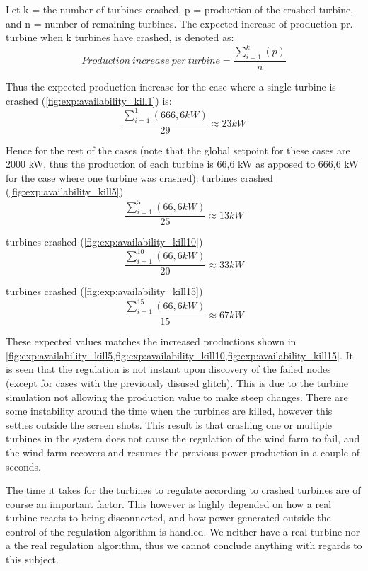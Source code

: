 Let k = the number of turbines crashed, p = production of the crashed turbine, and n = number of remaining turbines. The expected increase of production pr. turbine when k turbines have crashed, is denoted as: 
$$Production~increase~per~turbine = \frac{\sum\limits_{i=1}^k(p)}{n}$$

Thus the expected production increase for the case where a single turbine is crashed (\cref{fig:exp:availability_kill1}) is: $$\frac{\sum\limits_{i=1}^1(666,6kW)}{29}\approx23kW$$

Hence for the rest of the cases (note that the global setpoint for these cases are 2000 kW, thus the production of each turbine is 66,6 kW as apposed to 666,6 kW for the case where one turbine was crashed):
\newline\newline
{} turbines crashed (\cref{fig:exp:availability_kill5}) $$\frac{\sum\limits_{i=1}^5(66,6kW)}{25}\approx13kW$$

 turbines crashed (\cref{fig:exp:availability_kill10}) $$\frac{\sum\limits_{i=1}^{10}(66,6kW)}{20}\approx33kW$$

 turbines crashed (\cref{fig:exp:availability_kill15}) $$\frac{\sum\limits_{i=1}^{15}(66,6kW)}{15}\approx67kW$$

These expected values matches the increased productions shown in \cref{fig:exp:availability_kill5,fig:exp:availability_kill10,fig:exp:availability_kill15}.
It is seen that the regulation is not instant upon discovery of the failed nodes (except for cases with the previously disused glitch). This is due to the turbine simulation not allowing the production value to make steep changes.
There are some instability around the time when the turbines are killed, however this settles outside the screen shots.
This result is that crashing one or multiple turbines in the system does not cause the regulation of the wind farm to fail, and the wind farm recovers and resumes the previous power production in a couple of seconds.

The time it takes for the turbines to regulate according to crashed turbines are of course an important factor.
This however is highly depended on how a real turbine reacts to being disconnected, and how power generated outside the control of the regulation algorithm is handled.
We neither have a real turbine nor a the real regulation algorithm, thus we cannot conclude anything with regards to this subject.

